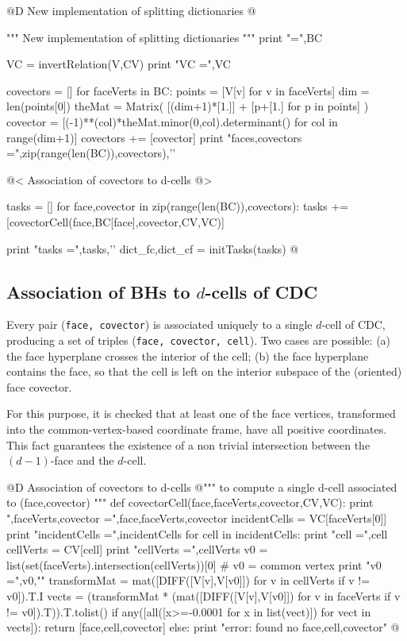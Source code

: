 \documentclass[11pt,oneside]{article}	%
\begin{document}
@D New implementation of splitting dictionaries
@{""" New implementation of splitting dictionaries """
print "\nBC =",BC

VC = invertRelation(V,CV)
print "VC =",VC

covectors = []
for faceVerts in BC:
	points = [V[v] for v in faceVerts]
	dim = len(points[0])
	theMat = Matrix( [(dim+1)*[1.]] + [p+[1.] for p in points] )
	covector = [(-1)**(col)*theMat.minor(0,col).determinant() 
						for col in range(dim+1)]
	covectors += [covector]
print "faces,covectors =",zip(range(len(BC)),covectors),'\n'	

@< Association of covectors to d-cells @>

tasks = []
for face,covector in zip(range(len(BC)),covectors):
	tasks += [covectorCell(face,BC[face],covector,CV,VC)]

print "tasks =",tasks,'\n'
dict_fc,dict_cf = initTasks(tasks)
@}



\subsection{Association of BHs to $d$-cells of CDC}

Every pair (\texttt{face, covector}) is associated uniquely to a single $d$-cell of CDC, producing a set of triples (\texttt{face, covector, cell}). Two cases are possible: (a) the face hyperplane crosses the interior of the cell; (b) the face hyperplane contains the face, so that the cell is left on the interior subspace of the (oriented) face covector.

For this purpose, it is checked that at least one of the face vertices, transformed into the common-vertex-based coordinate frame, have all positive coordinates. This fact guarantees the existence of a non trivial intersection between the $(d-1)$-face and the $d$-cell.


@D Association of covectors to d-cells
@{""" to compute a single d-cell associated to (face,covector) """
def covectorCell(face,faceVerts,covector,CV,VC):
	print "\nface,faceVerts,covector =",face,faceVerts,covector
	incidentCells = VC[faceVerts[0]]
	print "incidentCells =",incidentCells
	for cell in incidentCells:
		print "cell =",cell
		cellVerts = CV[cell]
		print "cellVerts =",cellVerts
		v0 = list(set(faceVerts).intersection(cellVerts))[0] # v0 = common vertex
		print "v0 =",v0,"\n"
		transformMat = mat([DIFF([V[v],V[v0]]) for v in cellVerts if v != v0]).T.I
		vects = (transformMat * (mat([DIFF([V[v],V[v0]]) for v in faceVerts 
					if v != v0]).T)).T.tolist()
		if any([all([x>=-0.0001 for x in list(vect)]) for vect in vects]): 
			return [face,cell,covector]
		else: print "error: found no face,cell,covector"
@}
\end{document}
